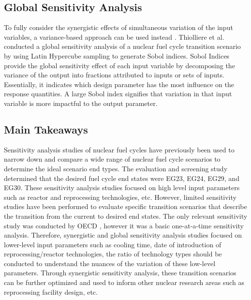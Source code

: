 \subsection{Global Sensitivity Analysis}
\label{sec:sobol}
To fully consider the synergistic effects of
simultaneous variation of the input variables, a variance-based 
approach can be used instead \cite{thiolliere_methodology_2018}.
Thiolliere et al. conducted a global sensitivity analysis of a 
nuclear fuel cycle transition scenario by using Latin Hypercube sampling 
to generate Sobol indices. 
Sobol Indices provide the global sensitivity effect of each 
input variable by decomposing the variance of the output into 
fractions attributed to inputs or sets of inputs.
Essentially, it indicates which design parameter has 
the most influence on the response quantities.
A large Sobol index signifies that variation in that input 
variable is more impactful to the output parameter.

\subsection{Main Takeaways}
Sensitivity analysis studies of nuclear fuel cycles have previously been used to narrow 
down and compare a wide range of nuclear fuel cycle scenarios to determine 
the ideal scenario end types. 
The evaluation and screening study determined that the desired 
fuel cycle end states were EG23, EG24, EG29, and EG30.
These sensitivity analysis studies focused on high level input 
parameters such as reactor and reprocessing technologies, etc.
However, limited sensitivity studies have been performed to 
evaluate specific transition scenarios that describe the transition 
from the current to desired end states.
The only relevant sensitivity study was conducted by OECD 
\cite{noauthor_effects_2017}, however it was a basic one-at-a-time 
sensitivity analysis.   
Therefore, synergistic and global sensitivity analysis studies focused on
lower-level input parameters such as cooling time, 
date of introduction of reprocessing/reactor 
technologies, the ratio of technology types should be conducted to 
understand the nuances of the variation of these low-level parameters. 
Through synergistic sensitivity analysis, these transition scenarios can be 
further optimized and used to inform other nuclear research areas 
such as reprocessing facility design, etc. 